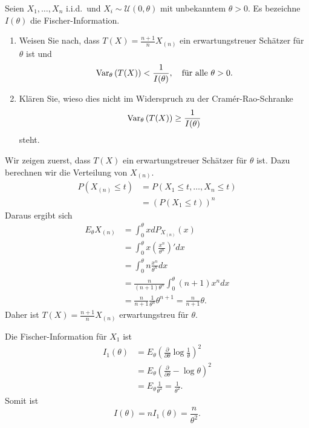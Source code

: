 Seien $X_1,\ldots,X_n$ i.i.d.\ und $X_i \sim \mathcal U(0,\theta)$ mit unbekanntem 
$\theta > 0$. Es bezeichne $I(\theta)$ die Fischer-Information. 
\begin{enumerate}
    \item
Weisen Sie nach, dass
$T(X)=\frac{n+1}{n}X_{(n)}$ ein erwartungstreuer Schätzer für $\theta$ ist und
\begin{equation*}
	\operatorname{Var}_\theta \left( T(X) \right) < \frac{1}{I(\theta)}, \quad \textrm{für alle } \theta>0. 
\end{equation*}
    \item Klären Sie, wieso dies nicht im Widerspruch zu der Cram\'er-Rao-Schranke
\begin{equation*}
	\operatorname{Var}_\theta\left( T(X) \right) \geq \frac{1}{I(\theta)}
\end{equation*}
steht.
\end{enumerate}


\solution Wir zeigen zuerst, dass $T(X)$ ein erwartungstreuer Schätzer
für $\theta$ ist. Dazu berechnen wir die Verteilung von $X_{(n)}$.
\begin{align*}
    P\left( X_{(n)} \leq t \right) &= P\left( X_1\leq t,\ldots, X_n\leq t \right) \\
    &= \left( P(X_1 \leq t) \right)^n
\end{align*}
Daraus ergibt sich
\begin{align*}
    E_\theta X_{(n)} &= \int_{0}^{\theta} x dP_{ X_{(n)} }(x) \\
    &= \int_{0}^{\theta} x \left( \frac{x^n}{\theta^n} \right)' dx \\
    &= \int_{0}^{\theta} n \frac{x^n}{\theta^n} dx \\
    &= \frac{n}{(n+1)\theta^n} \int_{0}^{\theta} (n+1)x^n dx \\
    &= \frac{n}{n+1} \frac{1}{\theta^n} \theta^{n+1} = \frac{n}{n+1} \theta.
\end{align*}
Daher ist $T(X) = \frac{n+1}{n} X_{(n)}$ erwartungstreu für $\theta$.

Die Fischer-Information für $X_1$ ist 
\begin{align*}
    I_1(\theta) &= 
    E_\theta\left( \frac{\partial}{\partial \theta} \log \frac{1}{\theta} \right)^2 \\
    &= E_\theta \left( \frac{\partial}{\partial \theta} -\log \theta \right)^2 \\
    &= E_\theta \frac{1}{\theta^2} = \frac{1}{\theta^2}.
\end{align*}
Somit ist
\begin{equation*}
    I(\theta) = n I_1 \left( \theta \right) = \frac{n}{\theta^2}.
\end{equation*}

